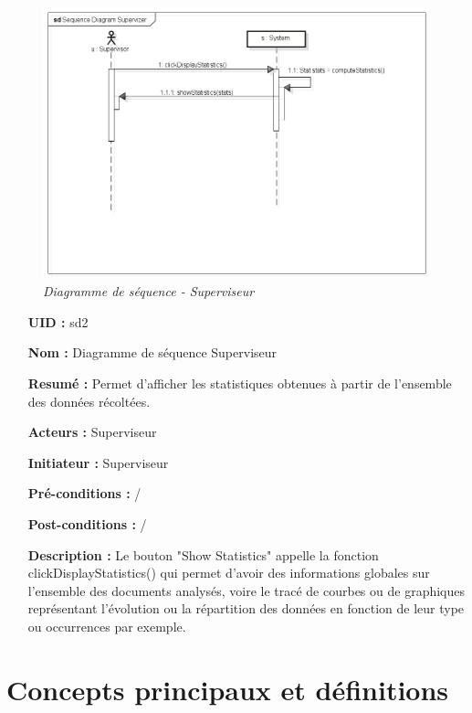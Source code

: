 \begin{figure}
	\begin{center}
		\includegraphics[scale = 0.4]{img/seqDiagSupervizer.png}
	\end{center}
	\caption{\it Diagramme de séquence - Superviseur}
	\label{seqDiagSupervizer}
\end{figure}

\begin{itemize}
	\item[{\bf UID :}] sd2
	\item[{\bf Nom :}] Diagramme de séquence Superviseur
	\item[{\bf Resumé :}]  Permet d'afficher les statistiques obtenues à partir de l'ensemble des données récoltées.
	\item[{\bf Acteurs :}] Superviseur
	\item[{\bf Initiateur :}] Superviseur
	\item[{\bf Pré-conditions :}]  /
	\item[{\bf Post-conditions :}]  /
\smallbreak
	\item[{\bf Description :}]
	Le bouton "Show Statistics" appelle la fonction clickDisplayStatistics() qui permet d'avoir des informations globales sur l'ensemble des documents analysés, voire le tracé de courbes ou de graphiques représentant l'évolution ou la répartition des données en fonction de leur type ou occurrences par exemple.
\end{itemize}

\newpage 

\section{Concepts principaux et définitions}

